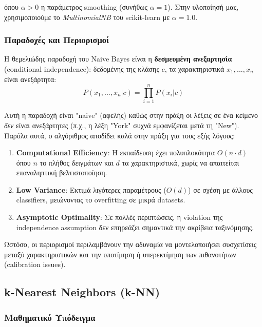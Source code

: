 \documentclass[12pt,a4paper,twoside]{book}
\begin{document}
όπου \(\alpha > 0\) η παράμετρος smoothing (συνήθως \(\alpha = 1\)). Στην υλοποίησή μας, χρησιμοποιούμε το \textit{MultinomialNB} του scikit-learn με \(\alpha = 1.0\).

\subsubsection{Παραδοχές και Περιορισμοί}

Η θεμελιώδης παραδοχή του Naive Bayes είναι η \textbf{δεσμευμένη ανεξαρτησία} (conditional independence): δεδομένης της κλάσης \(c\), τα χαρακτηριστικά \(x_1, ..., x_n\) είναι ανεξάρτητα:
\begin{equation}
    P(x_1, ..., x_n|c) = \prod_{i=1}^{n} P(x_i|c)
\end{equation}

Αυτή η παραδοχή είναι "naive" (αφελής) καθώς στην πράξη οι λέξεις σε ένα κείμενο \textit{δεν} είναι ανεξάρτητες (π.χ., η λέξη "York" συχνά εμφανίζεται μετά τη "New"). Παρόλα αυτά, ο αλγόριθμος αποδίδει καλά στην πράξη για τους εξής λόγους:

\begin{enumerate}
    \item \textbf{Computational Efficiency}: Η εκπαίδευση έχει πολυπλοκότητα \(O(n \cdot d)\) όπου \(n\) το πλήθος δειγμάτων και \(d\) τα χαρακτηριστικά, χωρίς να απαιτείται επαναληπτική βελτιστοποίηση.

    \item \textbf{Low Variance}: Εκτιμά λιγότερες παραμέτρους (\(O(d)\)) σε σχέση με άλλους classifiers, μειώνοντας το overfitting σε μικρά datasets.

    \item \textbf{Asymptotic Optimality}: Σε πολλές περιπτώσεις, η violation της independence assumption δεν επηρεάζει σημαντικά την ακρίβεια ταξινόμησης.
\end{enumerate}

Ωστόσο, οι περιορισμοί περιλαμβάνουν την αδυναμία να μοντελοποιήσει συσχετίσεις μεταξύ χαρακτηριστικών και την υποτίμηση ή υπερεκτίμηση των πιθανοτήτων (calibration issues).

\subsection{k-Nearest Neighbors (k-NN)}

\subsubsection{Μαθηματικό Υπόδειγμα}
\end{document}
